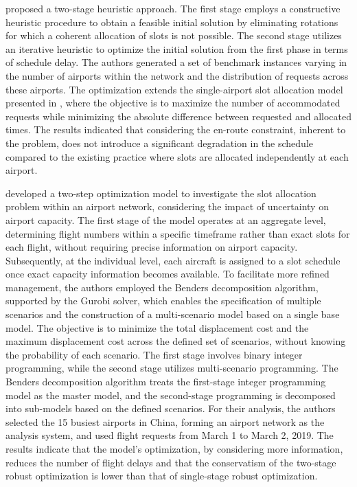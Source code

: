  proposed a two-stage heuristic approach. The first stage employs a constructive heuristic procedure to obtain a feasible initial solution by eliminating rotations for which a coherent allocation of slots is not possible. The second stage utilizes an iterative heuristic to optimize the initial solution from the first phase in terms of schedule delay. The authors generated a set of benchmark instances varying in the number of airports within the network and the distribution of requests across these airports. The optimization extends the single-airport slot allocation model presented in \cite{zografos2012dealing}, where the objective is to maximize the number of accommodated requests while minimizing the absolute difference between requested and allocated times. The results indicated that considering the en-route constraint, inherent to the problem, does not introduce a significant degradation in the schedule compared to the existing practice where slots are allocated independently at each airport.

  developed a two-step optimization model to investigate the slot allocation problem within an airport network, considering the impact of uncertainty on airport capacity. The first stage of the model operates at an aggregate level, determining flight numbers within a specific timeframe rather than exact slots for each flight, without requiring precise information on airport capacity. Subsequently, at the individual level, each aircraft is assigned to a slot schedule once exact capacity information becomes available. To facilitate more refined management, the authors employed the Benders decomposition algorithm, supported by the Gurobi solver, which enables the specification of multiple scenarios and the construction of a multi-scenario model based on a single base model. The objective is to minimize the total displacement cost and the maximum displacement cost across the defined set of scenarios, without knowing the probability of each scenario. The first stage involves binary integer programming, while the second stage utilizes multi-scenario programming. The Benders decomposition algorithm treats the first-stage integer programming model as the master model, and the second-stage programming is decomposed into sub-models based on the defined scenarios. For their analysis, the authors selected the 15 busiest airports in China, forming an airport network as the analysis system, and used flight requests from March 1 to March 2, 2019. The results indicate that the model's optimization, by considering more information, reduces the number of flight delays and that the conservatism of the two-stage robust optimization is lower than that of single-stage robust optimization.

